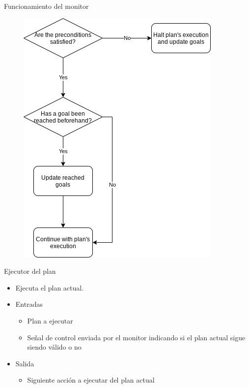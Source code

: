 \documentclass[11pt]{beamer}    %
\begin{document}
    \begin{frame}{Funcionamiento del monitor}
        \begin{figure}
            \centering
            \includegraphics[scale=0.4]{img/presentation/monitor}
        \end{figure}
    \end{frame}

    \begin{frame}{Ejecutor del plan}
        \begin{itemize}
            \item Ejecuta el plan actual.
            \item \alert{Entradas}
            \begin{itemize}
                \item Plan a ejecutar
                \item Señal de control enviada por el monitor indicando si
                el plan actual sigue siendo válido o no
            \end{itemize}
            \item \alert{Salida}
            \begin{itemize}
                \item Siguiente acción a ejecutar del plan actual
            \end{itemize}
        \end{itemize}
    \end{frame}
\end{document}
